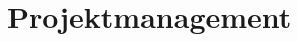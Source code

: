 \documentclass[main.tex]{subfiles} %
\begin{document}
\section{Projektmanagement}


\newpage


\newpage


\newpage
\end{document}
